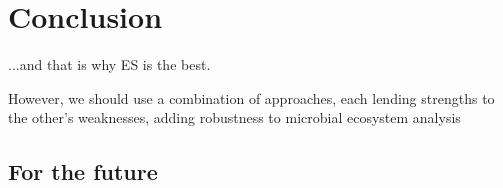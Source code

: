 \chapter{Conclusion}






...and that is why ES is the best.

However, we should use a combination of approaches, each lending strengths to the other's weaknesses, adding robustness to microbial ecosystem analysis~\cite{bohannan2003new}

\section{For the future}
